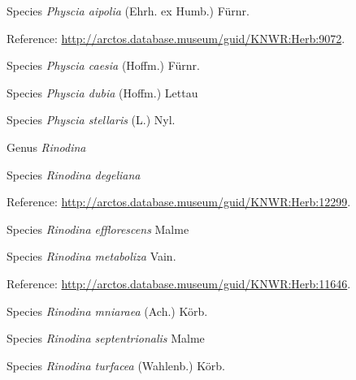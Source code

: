 \documentclass[9pt, article]{memoir}
\begin{document}
\begin{multicols}{2}
\vspace{6pt}\noindent\hspace{36pt}Species \textit{Physcia aipolia} (Ehrh. ex Humb.) Fürnr.


\vspace{6pt}Reference: 
\url{http://arctos.database.museum/guid/KNWR:Herb:9072}.

\vspace{6pt}\noindent\hspace{36pt}Species \textit{Physcia caesia} (Hoffm.) Fürnr.


\vspace{6pt}\noindent\hspace{36pt}Species \textit{Physcia dubia} (Hoffm.) Lettau


\vspace{6pt}\noindent\hspace{36pt}Species \textit{Physcia stellaris} (L.) Nyl.


\vspace{6pt}\noindent\hspace{30pt}Genus \textit{Rinodina}


\vspace{6pt}\noindent\hspace{36pt}Species \textit{Rinodina degeliana}


\vspace{6pt}Reference: 
\url{http://arctos.database.museum/guid/KNWR:Herb:12299}.

\vspace{6pt}\noindent\hspace{36pt}Species \textit{Rinodina efflorescens} Malme


\vspace{6pt}\noindent\hspace{36pt}Species \textit{Rinodina metaboliza} Vain.


\vspace{6pt}Reference: 
\url{http://arctos.database.museum/guid/KNWR:Herb:11646}.

\vspace{6pt}\noindent\hspace{36pt}Species \textit{Rinodina mniaraea} (Ach.) Körb.


\vspace{6pt}\noindent\hspace{36pt}Species \textit{Rinodina septentrionalis} Malme


\vspace{6pt}\noindent\hspace{36pt}Species \textit{Rinodina turfacea} (Wahlenb.) Körb.



\end{multicols}
\end{document}
